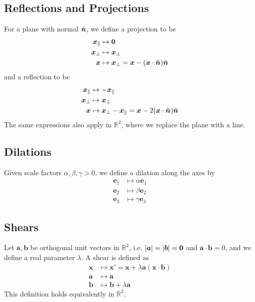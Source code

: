 \documentclass{article}
\begin{document}
\subsection{Reflections and Projections}
For a plane with normal $\hat{\bm n}$, we define a projection to be
\begin{align*}
	\bm x_\parallel & \mapsto \bm 0                                           \\
	\bm x_\perp     & \mapsto \bm x_\perp                                     \\
	\bm x           & \mapsto \bm x_\perp = \bm x - (\bm x \cdot \hat{\bm n}) \hat{\bm n}
\end{align*}
and a reflection to be
\begin{align*}
	\bm x_\parallel & \mapsto -\bm x_\parallel                                                   \\
	\bm x_\perp     & \mapsto \bm x_\perp                                                        \\
	\bm x           & \mapsto \bm x_\perp - \bm x_\parallel = \bm x - 2(\bm x \cdot \hat{\bm n}) \hat{\bm n}
\end{align*}
The same expressions also apply in $\mathbb R^2$, where we replace the plane with a line.

\subsection{Dilations}
Given scale factors $\alpha, \beta, \gamma > 0$, we define a dilation along the axes by
\begin{align*}
	\bm e_1 & \mapsto \alpha \bm e_1 \\
	\bm e_2 & \mapsto \beta \bm e_2  \\
	\bm e_3 & \mapsto \gamma \bm e_3
\end{align*}

\subsection{Shears}
Let $\bm a, \bm b$ be orthogonal unit vectors in $\mathbb R^3$, i.e. $\abs{\bm a} = \abs{\bm b} = \bm 0$ and $\bm a \cdot \bm b = 0$, and we define a real parameter $\lambda$. A shear is defined as
\begin{align*}
	\bm x & \mapsto \bm x' = \bm x + \lambda \bm a (\bm x \cdot \bm b) \\
	\bm a & \mapsto \bm a                                              \\
	\bm b & \mapsto \bm b + \lambda \bm a
\end{align*}
This definition holds equivalently in $\mathbb R^2$.
\end{document}

